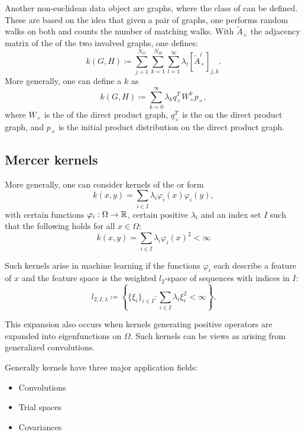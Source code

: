 \begin{example}
    Another non-euclidean data object are graphs, 
    where the class of 
    can be defined. These are based on the idea that given a pair of graphs,
    one performs random walks on both and counts the number of matching walks.
    With $\tilde{A}_\times$ the adjacency matrix of the  of the two 
    involved graphs, one defines:
    \[k(G,H)\coloneqq\sum_{j=1}^{N_G}\sum_{k=1}^{N_H}\sum_{l=1}^\infty\lambda_l[\tilde{A}^l_\times]_{j,k}.\]
    More generally, one can define a  $k$ as 
    \[k(G,H)\coloneqq \sum_{k=0}^\infty \lambda_k q_{\times}^T W^k_{\times}p_\times,\]
    where $W_\times$ is the  of the direct product graph, 
    $q_\times^T$ is the  on the direct product graph, 
    and $p_\times$ is the initial product distribution on the direct product graph.
\end{example}

\subsection{Mercer kernels}

More generally, one can consider kernels of the  or  form 
\[k(x,y)=\sum_{i\in I}\lambda_i\varphi_i(x)\varphi_i(y),\]
with certain functions $\varphi_i:\Omega\to\mathbb{R}$, certain positive  $\lambda_i$ and an 
index set $I$ such that the following  holds for all $x\in\Omega$:
\begin{equation}
    k(x,y)=\sum_{i\in I}\lambda_i\varphi_i(x)^2<\infty
\end{equation}

\begin{remark}
    Such kernels arise in machine learning if the functions $\varphi_i$ each describe a feature of $x$ and the 
    feature space is the weighted $l_2$-space of sequences with indices in $I$:
    \[l_{2,I,\lambda}\coloneqq\left\{\{\xi_i\}_{i\in I}:\sum_{i\in I}\lambda_i\xi_i^2 <\infty\right\}.\]
\end{remark}

This expansion also occurs when kernels generating positive operators are expanded into eigenfunctions on $\Omega$. Such kernels can 
be views as arising from generalized convolutions.

Generally kernels have three major application fields:
\begin{itemize}
    \item Convolutions 
    \item Trial spaces
    \item Covariances
\end{itemize}

